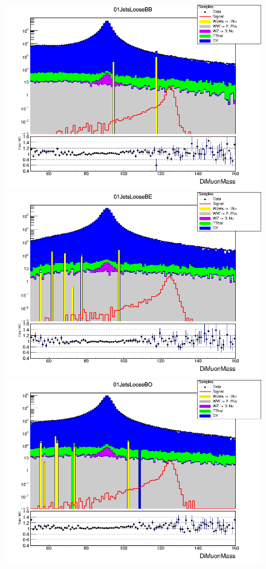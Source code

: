 \begin{figure}[H]
  \centering
  \includegraphics[width=0.65\linewidth]{figures/ch_higgs/distributions/baseline_kalman/distribution__01JetsLooseBB__DiMuonMass__logY.png}\\
  \includegraphics[width=0.65\linewidth]{figures/ch_higgs/distributions/baseline_kalman/distribution__01JetsLooseBE__DiMuonMass__logY.png}\\
  \includegraphics[width=0.65\linewidth]{figures/ch_higgs/distributions/baseline_kalman/distribution__01JetsLooseBO__DiMuonMass__logY.png}
  \caption{}
  \label{fig:higgs_categorization_01jetsloosebbbebo}
\end{figure}
